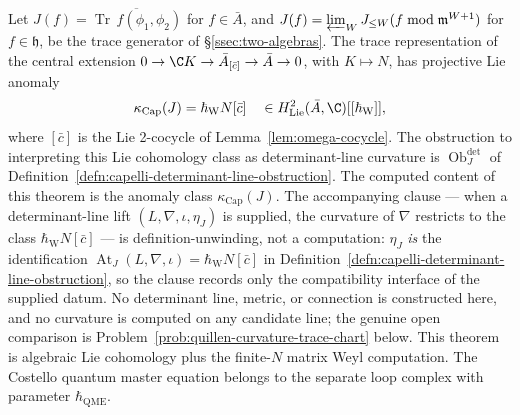 \documentclass[11pt]{memoir}
\begin{document}
\begin{thm}
\label{thm:capelli-projective-anomaly}
  Let \(J(f)=\overline{\operatorname{Tr}\,f(\phi_1,\phi_2)}\) for
  \(f\in\bar A\), and
  \(J(f)=\varprojlim_WJ_{\leq W}(f\bmod\mathfrak m^{W+1})\) for
  \(f\in\mathfrak h\), be the trace
  generator of \S\ref{ssec:two-algebras}.  The trace representation
  of the central extension
  \(0\to\C K\to\bar A_{[\bar c]}\to\bar A\to0\), with \(K\mapsto N\),
  has projective Lie anomaly
  \[
    \kappa_{\mathrm{Cap}}(J)=\hbar_{\mathrm{W}}N[\bar c]
    \quad\in H^2_{\mathrm{Lie}}(\bar A,\C)[[\hbar_{\mathrm{W}}]],
  \]
  where \([\bar c]\) is the Lie 2-cocycle of
  Lemma~\ref{lem:omega-cocycle}.  The obstruction to interpreting this
  Lie cohomology class as determinant-line curvature is
  \(\operatorname{Ob}^{\det}_J\) of
  Definition~\ref{defn:capelli-determinant-line-obstruction}.  The
  computed content of this theorem is the anomaly class
  \(\kappa_{\mathrm{Cap}}(J)\).  The accompanying clause --- when a
  determinant-line lift \((L,\nabla,\iota,\eta_J)\) is supplied, the
  curvature of \(\nabla\) restricts to the class
  \(\hbar_{\mathrm{W}}N[\bar c]\) --- is definition-unwinding, not a
  computation: \(\eta_J\) \emph{is} the identification
  \(\operatorname{At}_J(L,\nabla,\iota)=\hbar_{\mathrm{W}}N[\bar c]\)
  in Definition~\ref{defn:capelli-determinant-line-obstruction}, so
  the clause records only the compatibility interface of the supplied
  datum.  No determinant line, metric, or connection is constructed
  here, and no curvature is computed on any candidate line; the
  genuine open comparison is
  Problem~\ref{prob:quillen-curvature-trace-chart} below.  This
  theorem is algebraic Lie cohomology plus the finite-\(N\) matrix Weyl
  computation.  The Costello quantum master equation belongs to the
  separate loop complex with parameter \(\hbar_{\mathrm{QME}}\).
\end{thm}
\end{document}
